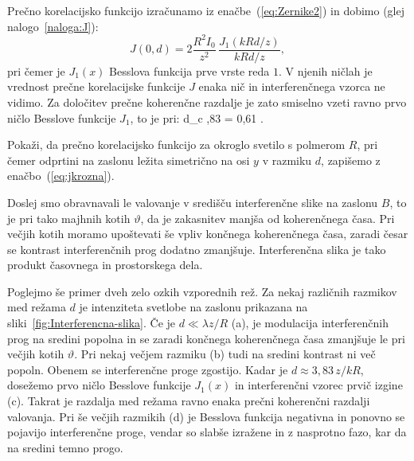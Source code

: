 Prečno korelacijsko funkcijo izračunamo iz enačbe~(\ref{eq:Zernike2}) in dobimo 
(glej nalogo~\ref{naloga:J}):
\begin{equation}
J(0,d)=2\frac{R^{2}I_{0}}{z^{2}}\,\frac{J_{1}(kRd/z)}{kRd/z},
\label{eq:jkrozna}
\end{equation}
pri čemer je $J_{1}(x)$ Besslova funkcija prve vrste reda $1$. V njenih ničlah
je vrednost prečne korelacijske funkcije $J$ enaka nič in interferenčnega vzorca ne vidimo. 
Za določitev prečne koherenčne razdalje je zato smiselno vzeti ravno prvo ničlo Besslove funkcije
$J_1$, to je pri:
\beq
\label{eq:okroglo_svetilo}
d_{c} ,83  = 0,61 .
\eeq
\begin{naloga}
\label{naloga:J}
Pokaži, da prečno korelacijsko funkcijo za okroglo svetilo s polmerom $R$, pri čemer
odprtini na zaslonu ležita simetrično na osi $y$ v razmiku $d$, zapišemo z enačbo~(\ref{eq:jkrozna}). 
\end{naloga}

Doslej smo obravnavali le valovanje v središču interferenčne slike na
zaslonu $B$, to je pri tako majhnih kotih $\vartheta$, da je zakasnitev
manjša od koherenčnega časa. Pri večjih kotih moramo upoštevati še
vpliv končnega koherenčnega časa, zaradi česar se kontrast interferenčnih
prog dodatno zmanjšuje. Interferenčna slika je 
tako produkt časovnega in prostorskega dela. 

Poglejmo še primer dveh zelo ozkih vzporednih rež. 
Za nekaj različnih razmikov med režama $d$ je intenziteta
svetlobe na zaslonu prikazana na sliki~\ref{fig:Interferencna-slika}.
Če je $d\ll\lambda z/R$ (a), je modulacija interferenčnih prog na sredini
popolna in se zaradi končnega koherenčnega časa zmanjšuje le pri večjih
kotih $\vartheta$. Pri nekaj večjem razmiku (b) tudi na sredini kontrast
ni več popoln. Obenem se interferenčne proge zgostijo. Kadar je $d\approx 3,83\,z/kR$,
dosežemo prvo ničlo Besslove funkcije $J_{1}(x)$ in interferenčni vzorec
prvič izgine (c). Takrat je razdalja med režama ravno enaka prečni
koherenčni razdalji valovanja. Pri še večjih razmikih (d) 
je Besslova funkcija negativna in ponovno se pojavijo interferenčne proge, 
vendar so slabše izražene in z nasprotno fazo, kar da na sredini temno progo. 

